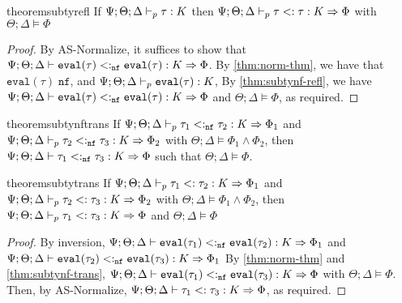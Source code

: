 \begin{restatable}{theorem}{subtyrefl}
If $\Psi ; \Theta ;  \Delta \vdash_p \tau : K$ then $\Psi ; \Theta ;  \Delta \vdash_p \tau<: \tau : K \Rightarrow \Phi$ with $\Theta ; \Delta \vDash \Phi$
\label{thm:subty-refl}
\end{restatable}
\begin{proof}
By AS-Normalize, it suffices to show that $\Psi ; \Theta ;  \Delta \vdash \texttt{eval}(\tau) <:_{\texttt{nf}} \texttt{eval}(\tau) : K \Rightarrow \Phi$. By \autoref{thm:norm-thm}, we have that $\texttt{eval}(\tau) \; \texttt{nf}$, and $\Psi ; \Theta ; \Delta \vdash_p \texttt{eval}(\tau) : K$, By \autoref{thm:subtynf-refl}, we have $\Psi ; \Theta ;  \Delta \vdash \texttt{eval}(\tau) <:_{\texttt{nf}} \texttt{eval}(\tau) : K \Rightarrow \Phi$ and $\Theta ; \Delta \vDash \Phi$, as required. 
\end{proof}

\begin{restatable}{theorem}{subtynftrans}
If $\Psi ; \Theta ; \Delta \vdash_p \tau_1 <:_{\texttt{nf}} \tau_2 : K \Rightarrow \Phi_1$ and $\Psi ; \Theta ; \Delta \vdash_p \tau_2 <:_{\texttt{nf}} \tau_3 : K \Rightarrow \Phi_2$ with $\Theta ; \Delta \vDash \Phi_1 \wedge \Phi_2$, then $\Psi ; \Theta ; \Delta \vdash \tau_1 <:_{\texttt{nf}} \tau_3 : K \Rightarrow \Phi$ such that $\Theta ; \Delta \vDash \Phi$.
\label{thm:subtynf-trans}
\end{restatable}

\begin{restatable}{theorem}{subtytrans}
\label{thm:subty-trans}
If $\Psi ; \Theta ; \Delta \vdash_p \tau_1 <: \tau_2 : K \Rightarrow \Phi_1$ and $\Psi ; \Theta ; \Delta \vdash_p \tau_2 <: \tau_3 : K \Rightarrow \Phi_2$ with $\Theta ; \Delta \vDash \Phi_1 \wedge \Phi_2$, then $\Psi ; \Theta ; \Delta \vdash_p \tau_1 <: \tau_3 : K \Rightarrow \Phi$ and $\Theta ; \Delta \vDash \Phi$
\end{restatable}
\begin{proof}
By inversion, $\Psi ; \Theta ; \Delta \vdash \texttt{eval}(\tau_1) <:_{\texttt{nf}} \texttt{eval}(\tau_2) : K \Rightarrow \Phi_1$ and $\Psi ; \Theta ; \Delta \vdash \texttt{eval}(\tau_2) <:_{\texttt{nf}} \texttt{eval}(\tau_3) : K \Rightarrow \Phi_1$ By \autoref{thm:norm-thm} and \autoref{thm:subtynf-trans}, 
$\Psi ; \Theta ; \Delta \vdash \texttt{eval}(\tau_1) <:_{\texttt{nf}} \texttt{eval}(\tau_3) : K \Rightarrow \Phi$ with $\Theta ; \Delta \vDash \Phi$. Then, by AS-Normalize,
$\Psi ; \Theta ; \Delta \vdash \tau_1 <: \tau_3 : K \Rightarrow \Phi$, as required.
\end{proof}

